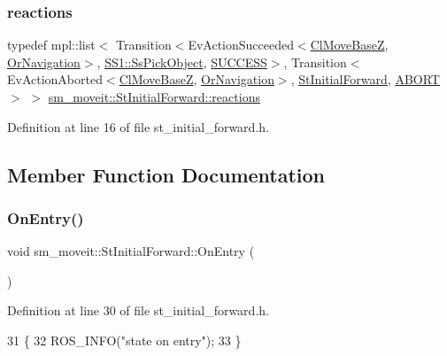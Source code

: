 \subsubsection{\texorpdfstring{reactions}{reactions}}
{\footnotesize\ttfamily typedef mpl\+::list$<$ Transition$<$Ev\+Action\+Succeeded$<$\hyperlink{classcl__move__base__z_1_1ClMoveBaseZ}{Cl\+Move\+BaseZ}, \hyperlink{classsm__moveit_1_1OrNavigation}{Or\+Navigation}$>$, \hyperlink{structsm__moveit_1_1SS1_1_1SsPickObject}{S\+S1\+::\+Ss\+Pick\+Object}, \hyperlink{classSUCCESS}{S\+U\+C\+C\+E\+SS}$>$, Transition$<$Ev\+Action\+Aborted$<$\hyperlink{classcl__move__base__z_1_1ClMoveBaseZ}{Cl\+Move\+BaseZ}, \hyperlink{classsm__moveit_1_1OrNavigation}{Or\+Navigation}$>$, \hyperlink{structsm__moveit_1_1StInitialForward}{St\+Initial\+Forward}, \hyperlink{classABORT}{A\+B\+O\+RT}$>$ $>$ \hyperlink{structsm__moveit_1_1StInitialForward_aac76c6ad78e7a30a868d3b984ede9ee2}{sm\+\_\+moveit\+::\+St\+Initial\+Forward\+::reactions}}



Definition at line 16 of file st\+\_\+initial\+\_\+forward.\+h.



\subsection{Member Function Documentation}
\mbox{\label{structsm__moveit_1_1StInitialForward_a1f63aa39057d5f4ab060eb05467afc81}} 
\subsubsection{\texorpdfstring{On\+Entry()}{OnEntry()}}
{\footnotesize\ttfamily void sm\+\_\+moveit\+::\+St\+Initial\+Forward\+::\+On\+Entry (\begin{DoxyParamCaption}{ }\end{DoxyParamCaption})\hspace{0.3cm}{\ttfamily [inline]}}



Definition at line 30 of file st\+\_\+initial\+\_\+forward.\+h.


\begin{DoxyCode}
31     \{
32         ROS\_INFO(\textcolor{stringliteral}{"state on entry"});
33     \}
\end{DoxyCode}
\mbox{\label{structsm__moveit_1_1StInitialForward_a58d406492a285ae86d2162159dc57738}} 
